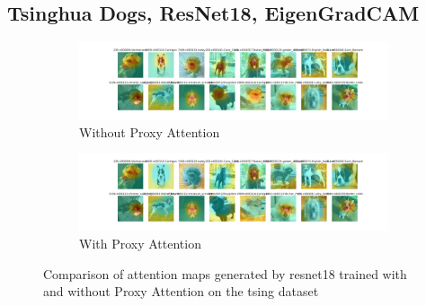\subsection{Tsinghua Dogs, ResNet18, EigenGradCAM}
    \begin{figure}[H]
        \begin{subfigure}[b]{1\textwidth}
            \includegraphics[width=\linewidth]{images/tsing_resnet18_noproxy_0.pdf}
            \caption{Without Proxy Attention}
        \end{subfigure}
        \begin{subfigure}[b]{1\textwidth}
            \includegraphics[width=\linewidth]{images/tsing_resnet18_proxy_0.pdf}
            \caption{With Proxy Attention}
        \end{subfigure}
        \caption{Comparison of attention maps generated by resnet18 trained with and without Proxy Attention on the tsing dataset}
    \end{figure}
    


